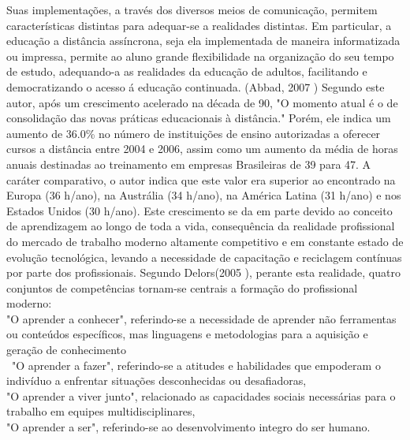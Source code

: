  
  Suas implementações, a través dos diversos meios de comunicação, permitem características distintas para adequar-se a realidades distintas. Em particular, a educação a distância assíncrona, seja ela implementada de maneira informatizada ou impressa, permite ao aluno grande flexibilidade na organização do seu tempo de estudo, adequando-a as realidades da educação de adultos, facilitando e democratizando o acesso á educação continuada. (Abbad, 2007 \cite{Abbad_2007}) Segundo este autor, após um crescimento acelerado na década de 90, "O momento atual é o de consolidação das novas práticas educacionais à distância." Porém, ele indica um aumento de 36.0\% no número de instituições de ensino autorizadas a oferecer cursos a distância entre 2004 e 2006, assim como um aumento da média de horas anuais destinadas ao treinamento em empresas Brasileiras de 39 para 47. A caráter comparativo, o autor indica que este valor era superior ao encontrado na Europa (36 h/ano), na Austrália (34 h/ano), na América Latina (31 h/ano) e nos Estados Unidos (30 h/ano). Este crescimento se da em parte devido ao conceito de aprendizagem ao longo de toda a vida, consequência da realidade profissional do mercado de trabalho moderno altamente competitivo e em constante estado de evolução tecnológica, levando a necessidade de capacitação e reciclagem contínuas por parte dos profissionais. Segundo Delors(2005 \cite{Delors_2005}), perante esta realidade, quatro conjuntos de competências tornam-se centrais a formação do profissional moderno:\\
  
  "O aprender a conhecer", referindo-se a necessidade de aprender não ferramentas ou conteúdos específicos, mas linguagens e metodologias para a aquisição e geração de conhecimento\\\
  "O aprender a fazer", referindo-se a atitudes e habilidades que empoderam o indivíduo a enfrentar situações desconhecidas ou desafiadoras,\\
  "O aprender a viver junto", relacionado as capacidades sociais necessárias para o trabalho em equipes multidisciplinares, \\
  "O aprender a ser", referindo-se ao desenvolvimento integro do ser humano.\\
  

